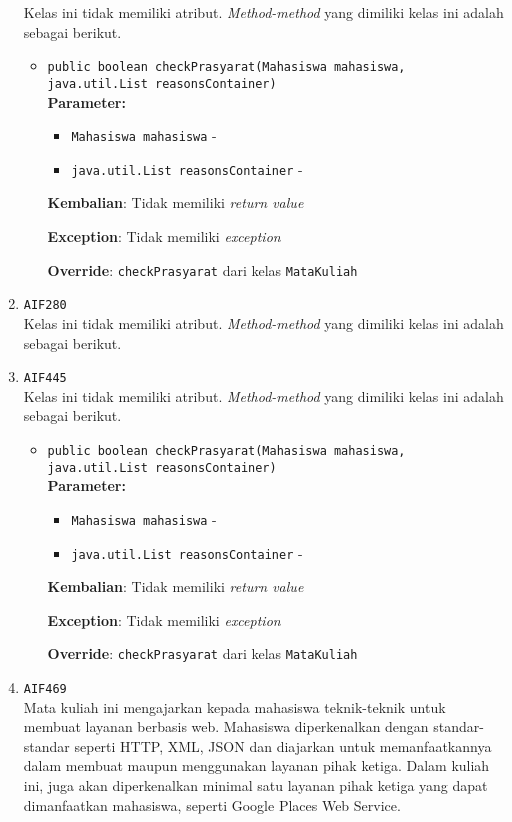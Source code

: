 \documentclass{article}
\begin{document}
\begin{enumerate}
Kelas ini tidak memiliki atribut. \textit{Method-method} yang dimiliki kelas ini adalah sebagai berikut.
\begin{itemize}
\item \texttt{public boolean checkPrasyarat(Mahasiswa mahasiswa, java.util.List reasonsContainer)}\\ 


\textbf{Parameter:}\begin{itemize}
\item \texttt{Mahasiswa mahasiswa} - 
\item \texttt{java.util.List reasonsContainer} - 
\end{itemize}
\textbf{Kembalian}: Tidak memiliki \textit{return value}

\textbf{Exception}: Tidak memiliki \textit{exception}

\textbf{Override}: \texttt{checkPrasyarat} dari kelas \texttt{MataKuliah}

\end{itemize}
\item \texttt{AIF280}\\ 
Kelas ini tidak memiliki atribut. \textit{Method-method} yang dimiliki kelas ini adalah sebagai berikut.
\begin{itemize}
\end{itemize}
\item \texttt{AIF445}\\ 
Kelas ini tidak memiliki atribut. \textit{Method-method} yang dimiliki kelas ini adalah sebagai berikut.
\begin{itemize}
\item \texttt{public boolean checkPrasyarat(Mahasiswa mahasiswa, java.util.List reasonsContainer)}\\ 


\textbf{Parameter:}\begin{itemize}
\item \texttt{Mahasiswa mahasiswa} - 
\item \texttt{java.util.List reasonsContainer} - 
\end{itemize}
\textbf{Kembalian}: Tidak memiliki \textit{return value}

\textbf{Exception}: Tidak memiliki \textit{exception}

\textbf{Override}: \texttt{checkPrasyarat} dari kelas \texttt{MataKuliah}

\end{itemize}
\item \texttt{AIF469}\\ 
Mata kuliah ini mengajarkan kepada mahasiswa teknik-teknik untuk membuat 
 layanan berbasis web. Mahasiswa diperkenalkan dengan standar-standar seperti 
 HTTP, XML, JSON dan diajarkan untuk memanfaatkannya dalam membuat maupun 
 menggunakan layanan pihak ketiga. Dalam kuliah ini, juga akan diperkenalkan 
 minimal satu layanan pihak ketiga yang dapat dimanfaatkan mahasiswa, seperti 
 Google Places Web Service.


\end{enumerate}
\end{document}
